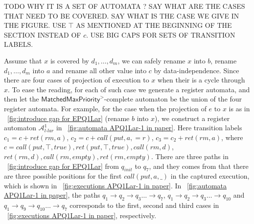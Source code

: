 TODO WHY IT IS A SET OF AUTOMATA ? SAY WHAT ARE THE CASES THAT NEED TO BE COVERED. SAY WHAT IS THE CASE WE GIVE IN THE FIGURE. USE $\top$ AS MENTIONED AT THE BEGINNING OF THE SECTION INSTEAD OF 	$c$. USE BIG CAPS FOR SETS OF TRANSITION LABELS.

{\color {blue} Assume that $x$ is covered by $d_1,\ldots,d_m$, we can safely rename $x$ into $b$, rename $d_1,\ldots,d_m$ into $a$ and rename all other value into $c$ by data-independence. Since there are four cases of projection of execution to $x$ when their is a cycle through $x$. To ease the reading, for each of such case we generate a register automata, and then let the $\mathsf{MatchedMaxPriority}^{>}$-complete automaton be the union of the four register automata. For example, for the case when the projection of $e$ to $x$ is as in \figurename~\ref{fig:introduce gap for EPQ1Lar} (rename $b$ into $x$), we construct a register automaton $\mathcal{A}_{\textit{l-lar}}^1$ in \figurename~\ref{fig:automata APQ1Lar-1 in paper}. Here transition labels $c_1 = c + \textit{ret}(\textit{rm},a)$, $c_2 = c + \textit{call}(\textit{put},a,=r)$, $c_3 = c_2 + \textit{ret}(\textit{rm},a)$, where $c = \textit{call}(\textit{put},\top,\textit{true}),\textit{ret}(\textit{put},\top,\textit{true}), \textit{call}(\textit{rm},d)$, $\textit{ret}(\textit{rm},d),\textit{call}(\textit{rm},\textit{empty}),\textit{ret}(\textit{rm},\textit{empty})$. There are three paths in \figurename~\ref{fig:introduce gap for EPQ1Lar} from $q_{\textit{init}}$ to $q_7$, and they comes from that there are three possible positions for the first $\textit{call}(\textit{put},a,\_)$ in the captured execution, which is shown in \figurename~\ref{fig:executions APQ1Lar-1 in paper}. In \figurename~\ref{fig:automata APQ1Lar-1 in paper}, the paths $q_1 \rightarrow q_2 \rightarrow q_3 \ldots \rightarrow q_7$, $q_1 \rightarrow q_2 \rightarrow q_3 \ldots \rightarrow q_{10}$ and $q_1 \rightarrow q_9 \rightarrow q_{10} \ldots \rightarrow q_7$ corresponds to the first, second and third cases in \figurename~\ref{fig:executions APQ1Lar-1 in paper}, respectively.
}

